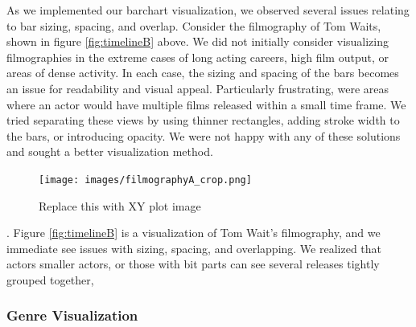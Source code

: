 \documentclass[12pt]{article}
\begin{document}
As we implemented our barchart visualization, we observed several issues relating to bar sizing, spacing, and overlap.  Consider the filmography of Tom Waits, shown in figure \ref{fig:timelineB} above. We did not initially consider visualizing filmographies in the extreme cases of long acting careers, high film output, or areas of dense activity.  In each case, the sizing and spacing of the bars becomes an issue for readability and visual appeal.  Particularly frustrating, were areas where an actor would have multiple films released within a small time frame.  We tried separating these views by using thinner rectangles, adding stroke width to the bars, or introducing opacity.  We were not happy with any of these solutions and sought a better visualization method.

\begin{figure}
	\centering
	\texttt{[image: images/filmographyA\_crop.png]}
				  \caption{Replace this with XY plot image}
\end{figure}


 .  Figure \ref{fig:timelineB} is a visualization of Tom Wait's filmography, and we immediate see issues with sizing, spacing, and overlapping.  We realized that actors smaller actors, or those with bit parts can see several releases tightly grouped together, 


\subsubsection{Genre Visualization}
\end{document}
